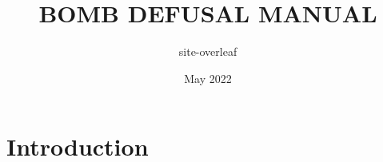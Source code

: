 \documentclass[a4paper]{article}
\title{BOMB DEFUSAL MANUAL}
\author{site-overleaf }
\date{May 2022}
\begin{document}
  \maketitle

  \section{Introduction}\label{sec:introduction}

  
\end{document}
